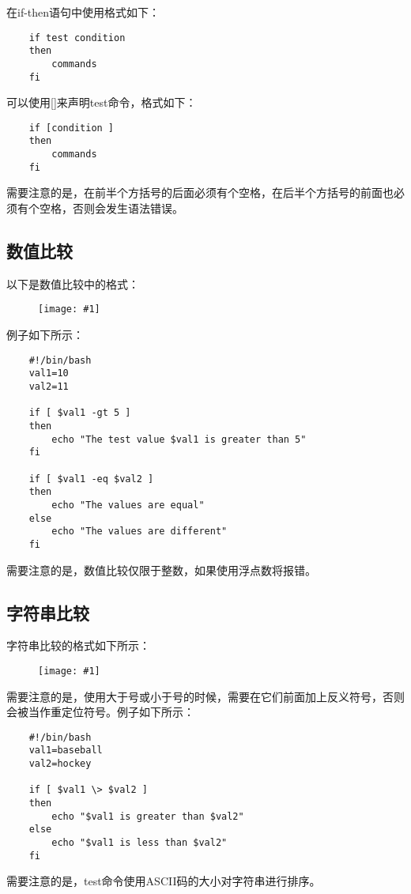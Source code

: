 \documentclass[a4paper,left=1.5cm,right=1.5cm,11pt]{article}
\newcommand{\fic}[1]{\begin{figure}[H]
		\center
		\texttt{[image: \#1]}
	\end{figure}}
\begin{document}
	在if-then语句中使用格式如下：
	\begin{lstlisting}
	if test condition
	then
		commands
	fi
	\end{lstlisting}

	可以使用[]来声明test命令，格式如下：
	\begin{lstlisting}
	if [condition ]
	then
		commands
	fi
	\end{lstlisting}

	需要注意的是，在前半个方括号的后面必须有个空格，在后半个方括号的前面也必须有个空格，否则会发生语法错误。

\subsection{数值比较}
	以下是数值比较中的格式：
	\fic{1.png}

	例子如下所示：
	\begin{lstlisting}
	#!/bin/bash
	val1=10
	val2=11

	if [ $val1 -gt 5 ]
	then
		echo "The test value $val1 is greater than 5"
	fi

	if [ $val1 -eq $val2 ]
	then
		echo "The values are equal"
	else
		echo "The values are different"
	fi
	\end{lstlisting}

	需要注意的是，数值比较仅限于整数，如果使用浮点数将报错。

\subsection{字符串比较}
	字符串比较的格式如下所示：
	\fic{2.png}

	需要注意的是，使用大于号或小于号的时候，需要在它们前面加上反义符号，否则会被当作重定位符号。例子如下所示：
	\begin{lstlisting}
	#!/bin/bash
	val1=baseball
	val2=hockey

	if [ $val1 \> $val2 ]
	then
		echo "$val1 is greater than $val2"
	else
		echo "$val1 is less than $val2"
	fi
	\end{lstlisting}

	需要注意的是，test命令使用ASCII码的大小对字符串进行排序。
\end{document}
